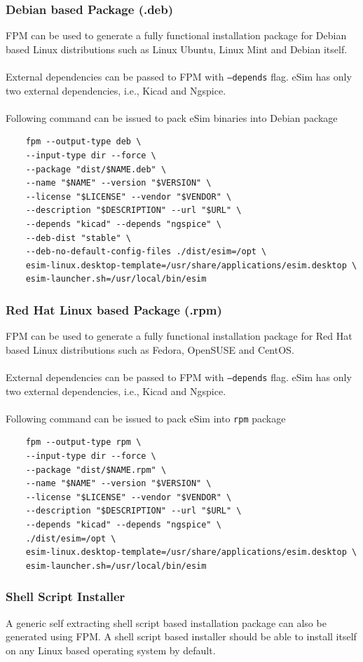 \documentclass[12pt,a4paper]{report}
\begin{document}
\subsubsection*{Debian based Package (.deb)}
FPM can be used to generate a fully functional installation package for Debian based Linux distributions such as Linux Ubuntu, Linux Mint and Debian itself.\\
\\
External dependencies can be passed to FPM with \texttt{--depends} flag. eSim has only two external dependencies, i.e., Kicad and Ngspice.\\
\\
Following command can be issued to pack eSim binaries into Debian package
\begin{verbatim}
    fpm --output-type deb \
    --input-type dir --force \
    --package "dist/$NAME.deb" \
    --name "$NAME" --version "$VERSION" \
    --license "$LICENSE" --vendor "$VENDOR" \
    --description "$DESCRIPTION" --url "$URL" \
    --depends "kicad" --depends "ngspice" \
    --deb-dist "stable" \
    --deb-no-default-config-files ./dist/esim=/opt \
    esim-linux.desktop-template=/usr/share/applications/esim.desktop \
    esim-launcher.sh=/usr/local/bin/esim
\end{verbatim}
\subsubsection*{Red Hat Linux based Package (.rpm)}
FPM can be used to generate a fully functional installation package for Red Hat based Linux distributions such as Fedora, OpenSUSE and CentOS.\\
\\
External dependencies can be passed to FPM with \texttt{--depends} flag. eSim has only two external dependencies, i.e., Kicad and Ngspice.\\
\\
Following command can be issued to pack eSim into \texttt{rpm} package
\begin{verbatim}
    fpm --output-type rpm \
    --input-type dir --force \
    --package "dist/$NAME.rpm" \
    --name "$NAME" --version "$VERSION" \
    --license "$LICENSE" --vendor "$VENDOR" \
    --description "$DESCRIPTION" --url "$URL" \
    --depends "kicad" --depends "ngspice" \
    ./dist/esim=/opt \
    esim-linux.desktop-template=/usr/share/applications/esim.desktop \
    esim-launcher.sh=/usr/local/bin/esim
\end{verbatim}
\subsubsection*{Shell Script Installer}
A generic self extracting shell script based installation package can also be generated using FPM. A shell script based installer should be able to install itself on any Linux based operating system by default.
\end{document}
